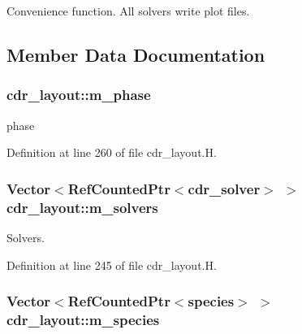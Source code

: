 Convenience function. All solvers write plot files. 



\subsection{Member Data Documentation}
\subsubsection[{\texorpdfstring{m\+\_\+phase}{m_phase}}]{ cdr\+\_\+layout\+::m\+\_\+phase\hspace{0.3cm}{\ttfamily [protected]}}\hypertarget{classcdr__layout_a08fecf36b3d6a5122615771ea2028c67}{}\label{classcdr__layout_a08fecf36b3d6a5122615771ea2028c67}


phase 



Definition at line 260 of file cdr\+\_\+layout.\+H.

\subsubsection[{\texorpdfstring{m\+\_\+solvers}{m_solvers}}]{\setlength{\rightskip}{0pt plus 5cm}Vector$<$Ref\+Counted\+Ptr$<${\bf cdr\+\_\+solver}$>$ $>$ cdr\+\_\+layout\+::m\+\_\+solvers\hspace{0.3cm}{\ttfamily [protected]}}\hypertarget{classcdr__layout_a9811b0266919332a196177d7bee7e49f}{}\label{classcdr__layout_a9811b0266919332a196177d7bee7e49f}


Solvers. 



Definition at line 245 of file cdr\+\_\+layout.\+H.

\subsubsection[{\texorpdfstring{m\+\_\+species}{m_species}}]{\setlength{\rightskip}{0pt plus 5cm}Vector$<$Ref\+Counted\+Ptr$<${\bf species}$>$ $>$ cdr\+\_\+layout\+::m\+\_\+species\hspace{0.3cm}{\ttfamily [protected]}}\hypertarget{classcdr__layout_a7a7c5d00661c158f026852fd2c88e310}{}\label{classcdr__layout_a7a7c5d00661c158f026852fd2c88e310}


